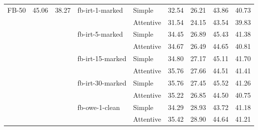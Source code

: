 \begin{tabular}{| l | r | r | l | l | r | r || r | r |}
    \multirow{10}{*}{FB-50}  & \multirow{10}{*}{45.06} & \multirow{10}{*}{38.27} & \multirow{2}{*}{fb-irt-1-marked}   & Simple    & 32.54 & 26.21 & 43.86 & 40.73 \\
                             &                         &                         &                                    & Attentive & 31.54 & 24.15 & 43.54 & 39.83 \\ \cline{4-9}
                             &                         &                         & \multirow{2}{*}{fb-irt-5-marked}   & Simple    & 34.45 & 26.89 & 45.43 & 41.38 \\
                             &                         &                         &                                    & Attentive & 34.67 & 26.49 & 44.65 & 40.81 \\ \cline{4-9}
                             &                         &                         & \multirow{2}{*}{fb-irt-15-marked}  & Simple    & 34.80 & 27.17 & 45.11 & 41.70 \\
                             &                         &                         &                                    & Attentive & 35.76 & 27.66 & 44.51 & 41.41 \\ \cline{4-9}
                             &                         &                         & \multirow{2}{*}{fb-irt-30-marked}  & Simple    & 35.76 & 27.45 & 45.52 & 41.26 \\
                             &                         &                         &                                    & Attentive & 35.22 & 26.85 & 44.50 & 40.75 \\ \cline{4-9}
                             &                         &                         & \multirow{2}{*}{fb-owe-1-clean}    & Simple    & 34.29 & 28.93 & 43.72 & 41.18 \\
                             &                         &                         &                                    & Attentive & 35.42 & 28.90 & 44.64 & 41.21 \\ \hline

\end{tabular}
